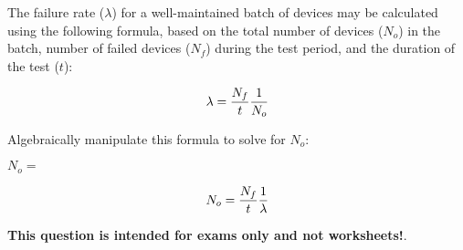 

The failure rate ($\lambda$) for a well-maintained batch of devices may be calculated using the following formula, based on the total number of devices ($N_o$) in the batch, number of failed devices ($N_f$) during the test period, and the duration of the test ($t$):

$$\lambda = {N_f \over t} {1 \over N_o}$$

Algebraically manipulate this formula to solve for $N_o$:

\vskip 20pt

$N_o = $







$$N_o = {N_f \over t} {1 \over \lambda}$$







{\bf This question is intended for exams only and not worksheets!}.



